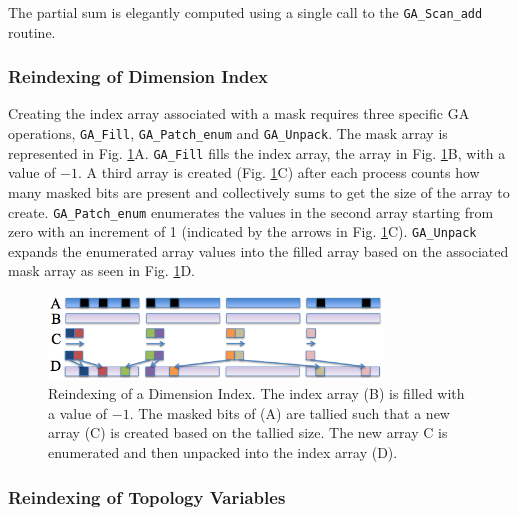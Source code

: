 
The partial sum is elegantly computed using a single call to the
\verb+GA_Scan_add+ routine.

\subsubsection{Reindexing of Dimension Index}

Creating the index array associated with a mask requires three specific GA
operations, \verb=GA_Fill=, \verb=GA_Patch_enum= and \verb=GA_Unpack=.  The
mask array is represented in Fig. \ref{fig:unpack}A.  \verb=GA_Fill= fills the
index array, the array in Fig. \ref{fig:unpack}B, with a value of $-1$.  A
third array is created (Fig. \ref{fig:unpack}C) after each process counts how
many masked bits are present and collectively sums to get the size of the
array to create.  \verb=GA_Patch_enum= enumerates the values in the second
array starting from zero with an increment of 1 (indicated by the arrows in
Fig. \ref{fig:unpack}C).  \verb=GA_Unpack= expands the enumerated array values
into the filled array based on the associated mask array as seen in Fig.
\ref{fig:unpack}D.

\begin{figure}[!t]
\center
\includegraphics[width=3.5in]{images/unpack}
\caption{Reindexing of a Dimension Index.  The index array (B) is filled with
a value of $-1$.  The masked bits of (A) are tallied such that a new array (C)
is created based on the tallied size.  The new array C is enumerated and then
unpacked into the index array (D).}
\label{fig:unpack}
\end{figure}

\subsubsection{Reindexing of Topology Variables}

